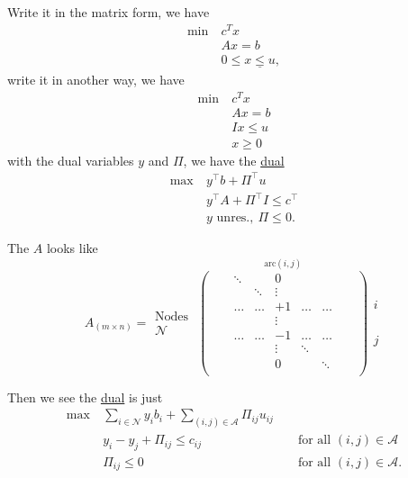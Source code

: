 \begin{answer}
	Write it in the matrix form, we have
	\begin{align*}
		\min~ & c^Tx                       \\
		      & Ax = b                     \\
		      & 0\leq \underline{x\leq u},
	\end{align*}
	write it in another way, we have
	\begin{align*}
		\min~ & c^Tx     \\
		      & Ax = b   \\
		      & Ix\leq u \\
		      & x\geq 0
	\end{align*}
	with the dual variables \(y\) and \(\Pi\), we have the \hyperref[def:dual]{dual}
	\begin{align*}
		\max~ & y^{\top}b + \Pi^{\top}u            \\
		      & y^{\top}A+\Pi^{\top}I\leq c^{\top} \\
		      & y\text{ unres.},\ \Pi\leq 0.
	\end{align*}

	The \(A\) looks like
	\[
		A_{(m\times n)} = \substack{\text{Nodes }\\\mathcal{N}}\overset{\mathrm{arc}(i, j)}{
			\begin{pmatrix}
				 &  & \ddots &        & 0      &        &        &  & \\
				 &  &        & \ddots & \vdots &        &        &  & \\
				 &  & \ldots & \ldots & +1     & \ldots & \ldots &  & \\
				 &  &        &        & \vdots &        &        &  & \\
				 &  & \ldots & \ldots & -1     & \ldots & \ldots &  & \\
				 &  &        &        & \vdots & \ddots &        &  & \\
				 &  &        &        & 0      &        & \ddots &  & \\
			\end{pmatrix}}\substack{i\\ \\ \\ \\ \\ j}
	\]

	Then we see the \hyperref[def:dual]{dual} is just
	\[
		\begin{alignedat}{3}
			\max~ & \sum\limits_{i\in\mathcal{N}}y_{i}b_{i}+\sum\limits_{(i, j)\in\mathcal{A}} \Pi_{ij}u_{ij}                                        \\
			& y_{i} - y_{j}+\Pi_{ij}\leq c_{ij}                                                         && \text{ for all }(i, j)\in\mathcal{A} \\
			& \Pi_{ij}\leq 0                                                                            && \text{ for all }(i, j)\in\mathcal{A}.
		\end{alignedat}
	\]
\end{answer}